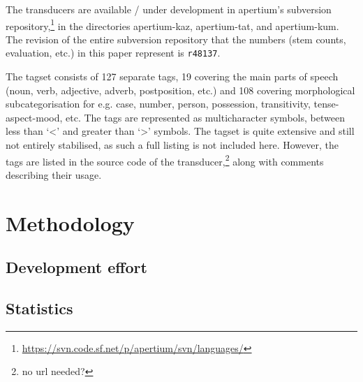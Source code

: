 \documentclass[a4paper,11pt,twocolumn]{article}
\begin{document}
The transducers are available / under development in apertium's subversion repository,\footnote{\url{https://svn.code.sf.net/p/apertium/svn/languages/}} in the directories apertium-kaz, apertium-tat, and apertium-kum.  The revision of the entire subversion repository that the numbers (stem counts, evaluation, etc.) in this paper represent is \texttt{r48137}.

The tagset consists of 127 separate tags, 19 covering the main parts of speech (noun, verb, adjective, adverb, postposition, etc.) and 108 covering morphological subcategorisation for e.g. case, number, person, possession, transitivity, tense-aspect-mood, etc. The tags are represented as multicharacter symbols, between less than `<' and greater than `>' symbols. The tagset is quite extensive and still not entirely stabilised, as such a full listing is not included here. However, the tags are listed in the source code of the transducer,\footnote{no url needed?} along with comments describing their usage.


\section{Methodology}



\subsection{Development effort}

\subsection{Statistics}
\end{document}
